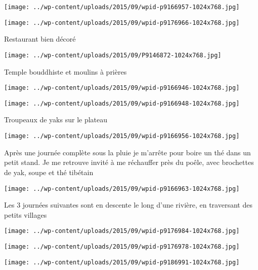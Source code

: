 \newline
\centerline{\texttt{[image: ../wp-content/uploads/2015/09/wpid-p9166957-1024x768.jpg]} } 
 \newline
 \newline
\centerline{\texttt{[image: ../wp-content/uploads/2015/09/wpid-p9176966-1024x768.jpg]} } 
 \newline
 Restaurant bien décoré \newline
 \newline
\centerline{\texttt{[image: ../wp-content/uploads/2015/09/P9146872-1024x768.jpg]} } 
 \newline
 Temple bouddhiste et moulins à prières \newline
 \newline
\centerline{\texttt{[image: ../wp-content/uploads/2015/09/wpid-p9166946-1024x768.jpg]} } 
 \newline
 \newline
\centerline{\texttt{[image: ../wp-content/uploads/2015/09/wpid-p9166948-1024x768.jpg]} } 
 \newline
 Troupeaux de yaks sur le plateau \newline
 \newline
\centerline{\texttt{[image: ../wp-content/uploads/2015/09/wpid-p9166956-1024x768.jpg]} } 
 \newline
 Après une journée complète sous la pluie je m'arrête pour boire un thé dans un petit stand. Je me retrouve invité à me réchauffer près du poêle, avec brochettes de yak, soupe et thé tibétain \newline
 \newline
\centerline{\texttt{[image: ../wp-content/uploads/2015/09/wpid-p9166963-1024x768.jpg]} } 
 \newline
 Les 3 journées suivantes sont en descente le long d'une rivière, en traversant des petits villages \newline
 \newline
\centerline{\texttt{[image: ../wp-content/uploads/2015/09/wpid-p9176984-1024x768.jpg]} } 
 \newline
 \newline
\centerline{\texttt{[image: ../wp-content/uploads/2015/09/wpid-p9176978-1024x768.jpg]} } 
 \newline
 \newline
\centerline{\texttt{[image: ../wp-content/uploads/2015/09/wpid-p9186991-1024x768.jpg]} } 
